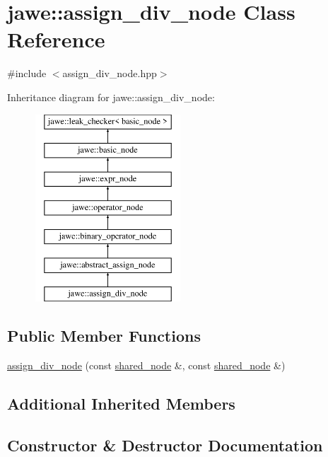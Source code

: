 \hypertarget{classjawe_1_1assign__div__node}{}\section{jawe\+:\+:assign\+\_\+div\+\_\+node Class Reference}
\label{classjawe_1_1assign__div__node}


{\ttfamily \#include $<$assign\+\_\+div\+\_\+node.\+hpp$>$}

Inheritance diagram for jawe\+:\+:assign\+\_\+div\+\_\+node\+:\begin{figure}[H]
\begin{center}
\leavevmode
\includegraphics[height=7.000000cm]{classjawe_1_1assign__div__node}
\end{center}
\end{figure}
\subsection*{Public Member Functions}
\begin{DoxyCompactItemize}
\item 
\hyperlink{classjawe_1_1assign__div__node_a6c93a864f22c14973cd85fb0b682cee5}{assign\+\_\+div\+\_\+node} (const \hyperlink{namespacejawe_a3f307481d921b6cbb50cc8511fc2b544}{shared\+\_\+node} \&, const \hyperlink{namespacejawe_a3f307481d921b6cbb50cc8511fc2b544}{shared\+\_\+node} \&)
\end{DoxyCompactItemize}
\subsection*{Additional Inherited Members}


\subsection{Constructor \& Destructor Documentation}
\mbox{\label{classjawe_1_1assign__div__node_a6c93a864f22c14973cd85fb0b682cee5}} 
